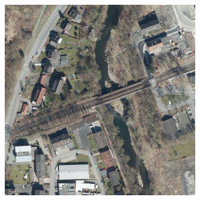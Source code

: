 \begin{figure}
\begin{subfigure}{\DopLabelImageWidth}
    \end{subfigure}
    \hfill
    \begin{subfigure}{\DopLabelImageWidth}
        \includegraphics[width=\textwidth]{images/3589_image}
    \end{subfigure}
    \hfill

    \vspace{3mm}


\end{figure}
